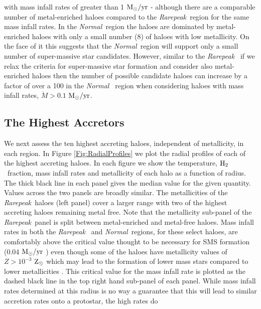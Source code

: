 \documentclass[graphics, twocolumn, usenatbib]{mn2e}
\newcommand{\msolaryr} {$\rm{M_{\odot}/yr}~$}
\newcommand{\msolaryrc} {$\rm{M_{\odot}/yr}$}
\newcommand{\zsolar} {$\rm{Z_{\odot}}~$}
\newcommand{\molH} {$\rm{H_2}$~}
\newcommand{\rarepeak} {\textit{Rarepeak~}}
\newcommand{\normal} {\textit{Normal~}}
\begin{document}
with mass infall rates of greater than 1 \msolaryr - although there are a comparable number of
metal-enriched haloes compared to the \rarepeak region for the same mass infall rates. In the
\normal region the haloes are dominated by metal-enriched haloes with only a small number (8)
of haloes with low metallicity. On the face of it this suggests that the \normal region will
support only a small number of super-massive star candidates. However, similar to the \rarepeak
if we relax the criteria for super-massive star formation and consider also metal-enriched haloes
then the number of possible candidate haloes can increase by a factor of over a 100 in the \normal
region when considering haloes with mass infall rates, $\dot{M} > 0.1 $ \msolaryrc. 



\subsection{The Highest Accretors}
\indent We next assess the ten highest accreting haloes, independent of metallicity, in each region. In Figure
\ref{Fig:RadialProfiles} we plot the radial profiles of each of the highest accreting haloes.
In each figure we show the temperature, \molH fraction, mass infall rates and
metallicity of each halo as a function of radius. The thick black line in each panel gives the
median value for the given quantity. Values across the two panels are broadly similar. The
metallicities of the \rarepeak haloes (left panel) cover a larger range with two of the highest
accreting haloes remaining metal free. Note that the metallicity sub-panel of the \rarepeak panel
is split between metal-enriched and metal-free haloes. Mass infall rates in both the \rarepeak
and \normal regions, for these select haloes, are comfortably above the critical value thought to
be necessary for SMS formation (0.04
\msolaryr \citep{Sakurai_2016}) even though some of the haloes have metallicity values of $Z > 10^{-3}$
\zsolar which may lead to the formation of lower mass stars compared to lower metallicities
\citep{Chon_2020}. This critical value for the mass infall rate is plotted as the dashed black line in
the top right hand sub-panel of each panel. While mass infall rates determined at this radius is no
way a guarantee that this will lead to similar accretion rates onto a protostar, the high rates do
\end{document}
